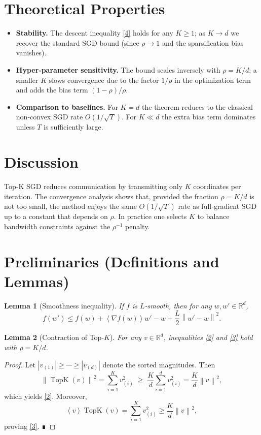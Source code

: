 \documentclass{article}
\newtheorem{lemma}{Lemma}
\newcommand{\norm}[1]{\left\|#1\right\|}
\newcommand{\inner}[1]{\left\langle #1 \right\rangle}
\newcommand{\TopK}{\operatorname{TopK}}
\newcommand{\R}{\mathbb{R}}
\begin{document}
\section*{Theoretical Properties}
\begin{itemize}[leftmargin=*]
\item \textbf{Stability.} The descent inequality \eqref{4} holds for any $K\ge1$; as $K\!\to\! d$ we recover the standard SGD bound (since $\rho\to1$ and the sparsification bias vanishes).
\item \textbf{Hyper‑parameter sensitivity.} The bound scales inversely with $\rho=K/d$; a smaller $K$ slows convergence due to the factor $1/\rho$ in the optimization term and adds the bias term $(1-\rho)/\rho$.
\item \textbf{Comparison to baselines.} For $K=d$ the theorem reduces to the classical non‑convex SGD rate $O(1/\sqrt{T})$. For $K\ll d$ the extra bias term dominates unless $T$ is sufficiently large.
\end{itemize}

\section*{Discussion}
Top‑K SGD reduces communication by transmitting only $K$ coordinates per iteration.  
The convergence analysis shows that, provided the fraction $\rho=K/d$ is not too small, the method enjoys the same $O(1/\sqrt{T})$ rate as full‑gradient SGD up to a constant that depends on $\rho$.  In practice one selects $K$ to balance bandwidth constraints against the $\rho^{-1}$ penalty.

\newpage

\section*{Preliminaries (Definitions and Lemmas)}
\begin{lemma}[Smoothness inequality]\label{lem:smooth}
If $f$ is $L$‑smooth, then for any $w,w'\in\R^{d}$,
\[
f(w')\le f(w)+\inner{\nabla f(w)}{w'-w}+\frac{L}{2}\norm{w'-w}^{2}.
\]
\end{lemma}
\begin{lemma}[Contraction of Top‑$K$]\label{lem:contract}
For any $v\in\R^{d}$, inequalities \eqref{2} and \eqref{3} hold with $\rho=K/d$.
\end{lemma}
\begin{proof}
Let $|v_{(1)}|\ge\cdots\ge|v_{(d)}|$ denote the sorted magnitudes.  
Then
\[
\norm{\TopK(v)}^{2}= \sum_{i=1}^{K} v_{(i)}^{2}\;\ge\;
\frac{K}{d}\sum_{i=1}^{d} v_{(i)}^{2}
=\frac{K}{d}\norm{v}^{2},
\]
which yields \eqref{2}.  Moreover,
\[
\inner{v}{\TopK(v)}=\sum_{i=1}^{K} v_{(i)}^{2}
\ge\frac{K}{d}\norm{v}^{2},
\]
proving \eqref{3}.  ∎
\end{proof}
\end{document}
